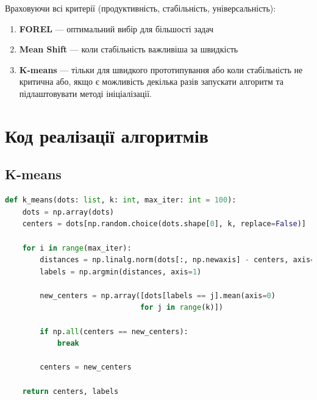 \documentclass[12pt,a4paper]{article}
\begin{document}
Враховуючи всі критерії (продуктивність, стабільність, універсальність):

\begin{enumerate}
    \item \textbf{FOREL} — оптимальний вибір для більшості задач
    \item \textbf{Mean Shift} — коли стабільність важливіша за швидкість
    \item \textbf{K-means} — тільки для швидкого прототипування або коли стабільність не критична або, якщо є можливість декілька разів запускати алгоритм та підлаштовувати методі ініціалізації.
\end{enumerate}

\appendix

\section{Код реалізації алгоритмів}

\subsection{K-means}
\begin{lstlisting}[language=Python, caption=Реалізація K-means]
def k_means(dots: list, k: int, max_iter: int = 100):
    dots = np.array(dots)
    centers = dots[np.random.choice(dots.shape[0], k, replace=False)]
    
    for i in range(max_iter):
        distances = np.linalg.norm(dots[:, np.newaxis] - centers, axis=2)
        labels = np.argmin(distances, axis=1)
        
        new_centers = np.array([dots[labels == j].mean(axis=0) 
                               for j in range(k)])
        
        if np.all(centers == new_centers):
            break
            
        centers = new_centers
    
    return centers, labels
\end{lstlisting}
\end{document}
